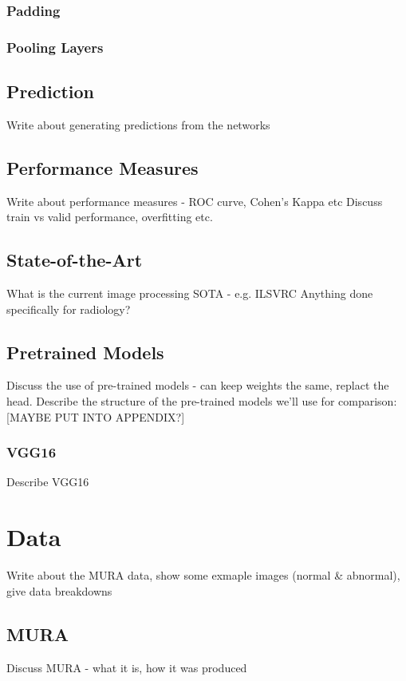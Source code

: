 \documentclass[11pt]{article} %
\theoremstyle{plain}
\theoremstyle{definition}
\begin{document}
\subsubsection{Padding}

\subsubsection{Pooling Layers}


\newpage
\subsection{Prediction}
Write about generating predictions from the networks

\subsection{Performance Measures}
Write about performance measures - ROC curve, Cohen's Kappa etc
Discuss train vs valid performance, overfitting etc.

\subsection{State-of-the-Art}
What is the current image processing SOTA - e.g. ILSVRC
Anything done specifically for radiology?

\subsection{Pretrained Models}
Discuss the use of pre-trained models - can keep weights the same, replact the head.
Describe the structure of the pre-trained models we'll use for comparison:
[MAYBE PUT INTO APPENDIX?] 
\subsubsection{VGG16}
Describe VGG16 \\



\newpage
\section{Data}
Write about the MURA data, show some exmaple images (normal \& abnormal), give data breakdowns 

\subsection{MURA}
Discuss MURA - what it is, how it was produced
\end{document}
